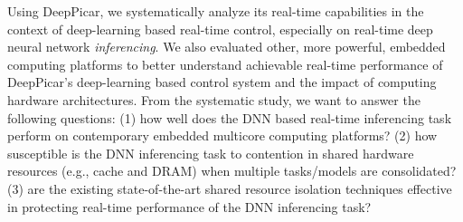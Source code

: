 
Using DeepPicar, we systematically analyze its real-time
capabilities in the context of deep-learning based real-time
control, especially on real-time deep neural network \emph{inferencing}.
We also evaluated other, more powerful, embedded computing
platforms to better understand achievable real-time performance of
DeepPicar's deep-learning based control system and the impact of
computing hardware architectures.
From the systematic study, we want to answer the following questions:
(1) how well does the DNN based real-time inferencing task perform on
contemporary embedded multicore computing platforms? (2) how
susceptible is the DNN inferencing task to contention in shared
hardware resources (e.g., cache and DRAM) when multiple tasks/models
are consolidated? (3) are the existing state-of-the-art shared resource
isolation techniques effective in protecting real-time performance of
the DNN inferencing task?

